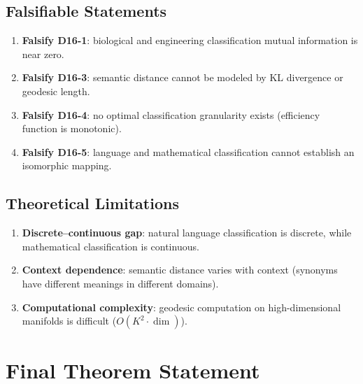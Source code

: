 \documentclass[12pt, a4paper]{article}
\begin{document}
\subsection{Falsifiable Statements}
\begin{enumerate}
    \item \textbf{Falsify D16-1}: biological and engineering classification mutual information is near zero.
    \item \textbf{Falsify D16-3}: semantic distance cannot be modeled by KL divergence or geodesic length.
    \item \textbf{Falsify D16-4}: no optimal classification granularity exists (efficiency function is monotonic).
    \item \textbf{Falsify D16-5}: language and mathematical classification cannot establish an isomorphic mapping.
\end{enumerate}

\subsection{Theoretical Limitations}
\begin{enumerate}
    \item \textbf{Discrete--continuous gap}: natural language classification is discrete, while mathematical classification is continuous.
    \item \textbf{Context dependence}: semantic distance varies with context (synonyms have different meanings in different domains).
    \item \textbf{Computational complexity}: geodesic computation on high-dimensional manifolds is difficult ($O(K^2 \cdot \dim)$).
\end{enumerate}

\section{Final Theorem Statement}
\end{document}
